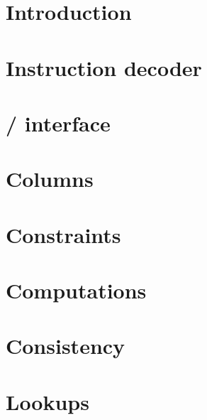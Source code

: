 

\section{Introduction}                         \label{mxp: intro}                       
\section{Instruction decoder}                  \label{mxp: instruction decoder}         
\section{\hubMod{} / \mxpMod{} interface}      \label{mxp: hub mxp interface}           
\section{Columns}                              \label{mxp: columns}                     
\section{Constraints}                          \label{mxp: constraints}                 
\section{Computations}                         \label{mxp: computations}                
\section{Consistency}                          \label{mxp: consistency}                 
\section{Lookups}                              \label{mxp: lookups}                     
